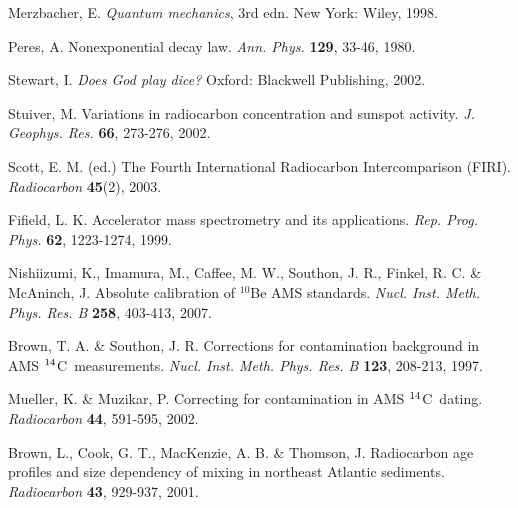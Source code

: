 \documentclass[12pt]{article}
\newcommand{\cft}{$^{\rm 14}$C}
\begin{document}
\begin{thebibliography}{9}
Merzbacher, E.
{\em Quantum mechanics}, 3rd edn.
New York: Wiley, 1998.

Peres, A.
Nonexponential decay law.
{\em Ann. Phys.} {\bf 129}, 33-46, 1980.

Stewart, I.
{\em Does God play dice?}
Oxford: Blackwell Publishing, 2002.

Stuiver, M.
Variations in radiocarbon concentration and sunspot activity.
{\em J. Geophys. Res.} {\bf 66}, 273-276, 2002.

Scott, E. M. (ed.)
The Fourth International Radiocarbon Intercomparison (FIRI).
{\em Radiocarbon} {\bf 45}(2), 2003.

Fifield, L. K.
Accelerator mass spectrometry and its applications.
{\em Rep. Prog. Phys.} {\bf 62}, 1223-1274, 1999.

Nishiizumi, K., Imamura, M., Caffee, M. W., Southon, J. R.,
Finkel, R. C. \& McAninch, J.
Absolute calibration of $^{10}$Be AMS standards.
{\em Nucl. Inst. Meth. Phys. Res. B} {\bf 258}, 403-413, 2007.

Brown, T. A. \& Southon, J. R.
Corrections for contamination background in AMS \cft~measurements.
{\em Nucl. Inst. Meth. Phys. Res. B} {\bf 123}, 208-213, 1997.

Mueller, K. \& Muzikar, P.
Correcting for contamination in AMS \cft~dating.
{\em Radiocarbon} {\bf 44}, 591-595, 2002.

Brown, L., Cook, G. T., MacKenzie, A. B. \& Thomson, J.
Radiocarbon age profiles and size dependency of mixing in northeast
Atlantic sediments.
{\em Radiocarbon} {\bf 43}, 929-937, 2001.

\end{thebibliography}
\end{document}
